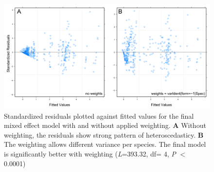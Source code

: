 \clearpage

\begin{figure} [H] %
\centering
\includegraphics[width=17cm]{Images/residuals}
 \caption{Standardized residuals plotted against fitted values for the final mixed effect model with and without applied weighting. \textbf{A} Without weighting, the residuals show strong pattern of heteroscedasticy. \textbf{B} The weighting allows different variance per species. The final model is significantly better with weighting (\textit{L}=393.32, df= 4, \textit{P} $<$ 0.0001)}
 \label{fig:residuals}
\end{figure}


